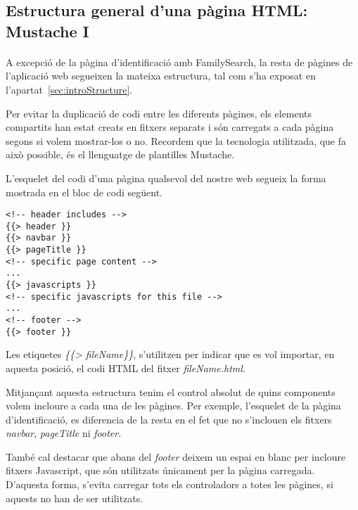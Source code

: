 \subsection{Estructura general d'una pàgina HTML: Mustache I}

    \paragraph{}
    A excepció de la pàgina d'identificació amb FamilySearch, la resta de pàgines de l'aplicació web segueixen la mateixa estructura, tal com s'ha exposat en l'apartat~\ref{sec:introStructure}.

    Per evitar la duplicació de codi entre les diferents pàgines, els elements compartits han estat creats en fitxers separats i són carregats a cada pàgina segons si volem mostrar-los o no. Recordem que la tecnologia utilitzada, que fa això possible, és el llenguatge de plantilles Mustache.

    L'esquelet del codi d'una pàgina qualsevol del nostre web segueix la forma mos\-tra\-da en el bloc de codi següent.

    \begin{lstlisting}[style=rawOwn,caption={Exemple d'inclusió de fitxers HTML amb Mustache}]
<!-- header includes -->
{{> header }}
{{> navbar }}
{{> pageTitle }}
<!-- specific page content -->
...
{{> javascripts }}
<!-- specific javascripts for this file -->
...
<!-- footer -->
{{> footer }}
    \end{lstlisting}

    Les etiquetes \emph{\{\{> fileName\}\}}, s'utilitzen per indicar que es vol importar, en aquesta posició, el codi HTML del fitxer \emph{fileName.html}.

    Mitjançant aquesta estructura tenim el control absolut de quins components volem incloure a cada una de les pàgines. Per exemple, l'esquelet de la pàgina d'identificació, es diferencia de la resta en el fet que no s'inclouen els fitxers \emph{navbar}, \emph{pageTitle} ni  \emph{footer}.

    També cal destacar que abans del \emph{footer} deixem un espai en blanc per incloure fitxers Javascript, que són utilitzats únicament per la pàgina carregada. D'aquesta forma, s'evita carregar tots els controladors a totes les pàgines, si aquests no han de ser utilitzats.
